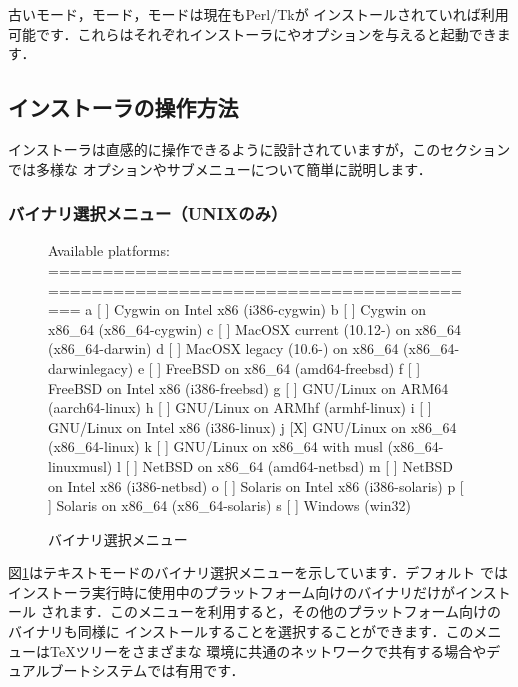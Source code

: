\documentclass[uplatex,dvipdfmx,tombow]{jsarticle}
\begin{document}
古いモード，モード，モードは現在もPerl/Tkが
インストールされていれば利用可能です．これらはそれぞれインストーラにやオプションを与えると起動できます．

\subsection{インストーラの操作方法}
\label{sec:runinstall}

インストーラは直感的に操作できるように設計されていますが，このセクションでは多様な
オプションやサブメニューについて簡単に説明します．

\subsubsection{バイナリ選択メニュー（UNIXのみ）}
\label{sec:binary}

\begin{figure}[tb]
\begin{boxedverbatim}
Available platforms:
===============================================================================
   a [ ] Cygwin on Intel x86 (i386-cygwin)
   b [ ] Cygwin on x86_64 (x86_64-cygwin)
   c [ ] MacOSX current (10.12-) on x86_64 (x86_64-darwin)
   d [ ] MacOSX legacy (10.6-) on x86_64 (x86_64-darwinlegacy)
   e [ ] FreeBSD on x86_64 (amd64-freebsd)
   f [ ] FreeBSD on Intel x86 (i386-freebsd)
   g [ ] GNU/Linux on ARM64 (aarch64-linux)
   h [ ] GNU/Linux on ARMhf (armhf-linux)
   i [ ] GNU/Linux on Intel x86 (i386-linux)
   j [X] GNU/Linux on x86_64 (x86_64-linux)
   k [ ] GNU/Linux on x86_64 with musl (x86_64-linuxmusl)
   l [ ] NetBSD on x86_64 (amd64-netbsd)
   m [ ] NetBSD on Intel x86 (i386-netbsd)
   o [ ] Solaris on Intel x86 (i386-solaris)
   p [ ] Solaris on x86_64 (x86_64-solaris)
   s [ ] Windows (win32)
\end{boxedverbatim}
\vspace{-1zh}
\caption{バイナリ選択メニュー}\label{fig:bin-text}
\end{figure}

図\ref{fig:bin-text}はテキストモードのバイナリ選択メニューを示しています．デフォルト
ではインストーラ実行時に使用中のプラットフォーム向けのバイナリだけがインストール
されます．このメニューを利用すると，その他のプラットフォーム向けのバイナリも同様に
インストールすることを選択することができます．このメニューは\TeX ツリーをさまざまな
環境に共通のネットワークで共有する場合やデュアルブートシステムでは有用です．
\end{document}
